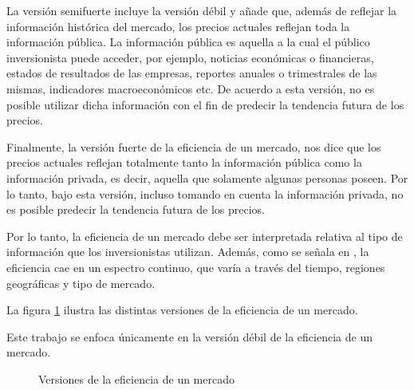 \documentclass[12pt]{report}
\theoremstyle{break}
\theoremstyle{break}
\begin{document}
La versión semifuerte incluye la versión débil y añade que, además de reflejar la información histórica del mercado, los precios actuales reflejan toda la información pública. La información pública es aquella a la cual el público inversionista puede acceder, por ejemplo, noticias económicas o financieras, estados de resultados de las empresas, reportes anuales o trimestrales de las mismas, indicadores macroeconómicos etc. De acuerdo a esta versión, no es posible utilizar dicha información con el fin de predecir la tendencia futura de los precios.

Finalmente, la versión fuerte de la eficiencia de un mercado, nos dice que los precios actuales reflejan totalmente tanto la información pública como la información privada, es decir, aquella que solamente algunas personas poseen. Por lo tanto, bajo esta versión, incluso tomando en cuenta la información privada, no es posible predecir la tendencia futura de los precios.

Por lo tanto, la eficiencia de un mercado debe ser interpretada relativa al tipo de información que los inversionistas utilizan. Además, como se señala en \cite{CFA2019}, la eficiencia cae en un espectro continuo, que varía a través del tiempo, regiones geográficas y tipo de mercado.

La figura \ref{imagen:versiones emh} ilustra las distintas versiones de la eficiencia de un mercado.

Este trabajo se enfoca únicamente en la versión débil de la eficiencia de un mercado.

\begin{figure}[ht]
\centering
{}
\caption{\label{imagen:versiones emh} Versiones de la eficiencia de un mercado}
\end{figure}
\end{document}
